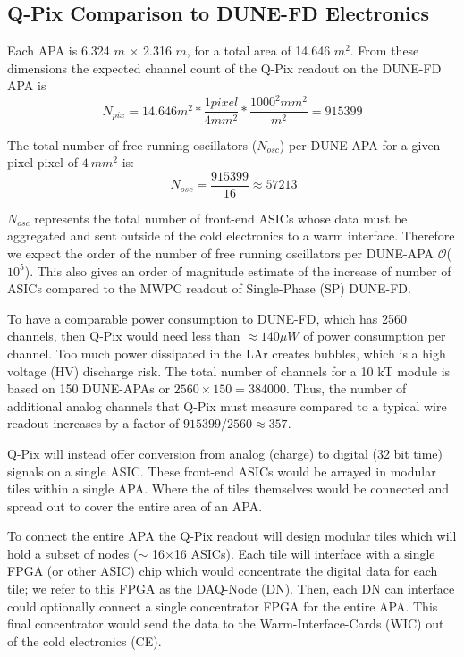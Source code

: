 \subsection{Q-Pix Comparison to DUNE-FD Electronics}

Each APA is 6.324 $\unit{m}$ $\times$ 2.316 $\unit{m}$, for a total area of 14.646 $\unit{m^{2}}$.
From these dimensions the expected channel count of the Q-Pix readout on the DUNE-FD APA is
\begin{equation}
  N_{pix} = 14.646 m^{2} * \frac{1 pixel}{4 mm^{2}} * \frac{ 1000^{2} mm^{2} }{m^{2}} = 915399
\end{equation}

The total number of free running oscillators ($N_{osc}$) per DUNE-APA for a given pixel pixel of $4~mm^{2}$ is:
\begin{equation}~\label{eq:nosc}
N_{osc} = \frac{915399}{16} \approx 57213
\end{equation}

$N_{osc}$ represents the total number of front-end ASICs whose data must be aggregated and sent outside of the cold electronics to a warm interface.
Therefore we expect the order of the number of free running oscillators per DUNE-APA $\mathcal{O}$($10^5$).
This also gives an order of magnitude estimate of the increase of number of ASICs compared to the MWPC readout of Single-Phase (SP) DUNE-FD.

To have a comparable power consumption to DUNE-FD, which has 2560 channels, then Q-Pix would need less than $\approx 140 \mu W$ of power consumption per channel.
Too much power dissipated in the LAr creates bubbles, which is a high voltage (HV) discharge risk.
The total number of channels for a 10 kT module is based on 150 DUNE-APAs or $2560\times 150 = $384000.
Thus, the number of additional analog channels that Q-Pix must measure compared to a typical wire readout increases by a factor of $915399 / 2560 \approx 357$.

Q-Pix will instead offer conversion from analog (charge) to digital (32 bit time) signals on a single ASIC.
These front-end ASICs would be arrayed in modular tiles within a single APA.
Where the of tiles themselves would be connected and spread out to cover the entire area of an APA.

To connect the entire APA the Q-Pix readout will design modular tiles which will hold a subset of nodes ($\sim$ 16$\times$16 ASICs).
Each tile will interface with a single FPGA (or other ASIC) chip which would concentrate the digital data for each tile; we refer to this FPGA as the DAQ-Node (DN).
Then, each DN can interface could optionally connect a single concentrator FPGA for the entire APA.
This final concentrator would send the data to the Warm-Interface-Cards (WIC) out of the cold electronics (CE).

